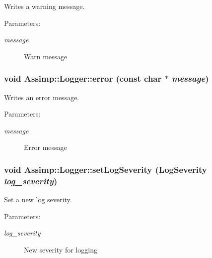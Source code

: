 Writes a warning message. 

\begin{Desc}
\item[Parameters:]
\begin{description}
\item[{\em message}]Warn message \end{description}
\end{Desc}
\hypertarget{class_assimp_1_1_logger_a8b7c3f56dc4cecfdacc8bb36ba3fac1}{
\subsubsection[error]{\setlength{\rightskip}{0pt plus 5cm}void Assimp::Logger::error (const char $\ast$ {\em message})}}
\label{class_assimp_1_1_logger_a8b7c3f56dc4cecfdacc8bb36ba3fac1}


Writes an error message. 

\begin{Desc}
\item[Parameters:]
\begin{description}
\item[{\em message}]Error message \end{description}
\end{Desc}
\hypertarget{class_assimp_1_1_logger_8fb4fa4c2c329a36ac39bc9c743925f1}{
\subsubsection[setLogSeverity]{\setlength{\rightskip}{0pt plus 5cm}void Assimp::Logger::setLogSeverity ({\bf LogSeverity} {\em log\_\-severity})}}
\label{class_assimp_1_1_logger_8fb4fa4c2c329a36ac39bc9c743925f1}


Set a new log severity. 

\begin{Desc}
\item[Parameters:]
\begin{description}
\item[{\em log\_\-severity}]New severity for logging \end{description}
\end{Desc}


